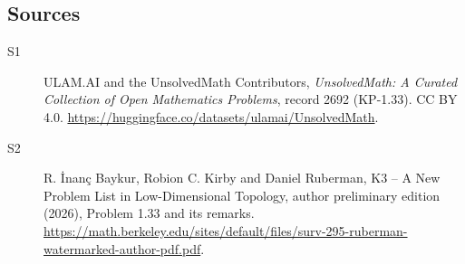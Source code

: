 \documentclass[11pt]{article}
\begin{document}
\subsection{Sources}
\begin{description}
\item[\hypertarget{source:2692:1}{S1}] ULAM.AI and the UnsolvedMath Contributors, \emph{UnsolvedMath: A Curated Collection of Open Mathematics Problems}, record 2692 (KP-1.33). CC BY 4.0. \url{https://huggingface.co/datasets/ulamai/UnsolvedMath}.
\item[\hypertarget{source:2692:2}{S2}] R. \.{I}nan\c{c} Baykur, Robion C. Kirby and Daniel Ruberman, K3 -- A New Problem List in Low-Dimensional Topology, author preliminary edition (2026), Problem 1.33 and its remarks. \url{https://math.berkeley.edu/sites/default/files/surv-295-ruberman-watermarked-author-pdf.pdf}.
\end{description}
\label{end:2692}
\end{document}

